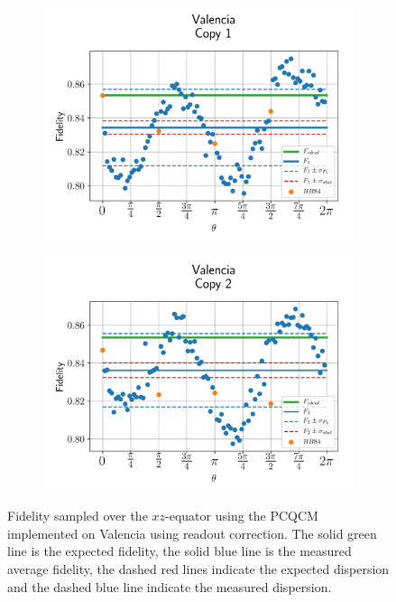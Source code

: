 \begin{figure}[H]
  \centering
  \begin{subfigure}{.5\textwidth}
    \centering
    \includegraphics[width=\textwidth]{Figures/PhaseCovariant/IBM/OnlyEquator/results_corrected_valencia_copy1.png}
    \label{fig:pc_corrected_valencia_equator_1}
  \end{subfigure}%
  \begin{subfigure}{.5\textwidth}
    \centering
    \includegraphics[width=\textwidth]{Figures/PhaseCovariant/IBM/OnlyEquator/results_corrected_valencia_copy2.png}
    \label{fig:pc_corrected_valencia_equator_2}
  \end{subfigure}
  \vspace{-0.5cm}
  \caption{Fidelity sampled over the $xz$-equator using the PCQCM implemented on Valencia using readout correction. The solid green line is the expected fidelity, the solid blue line is the measured average fidelity, the dashed red lines indicate the expected dispersion and the dashed blue line indicate the measured dispersion.}
  \label{fig:pc_corrected_valencia_equator}
\end{figure}


